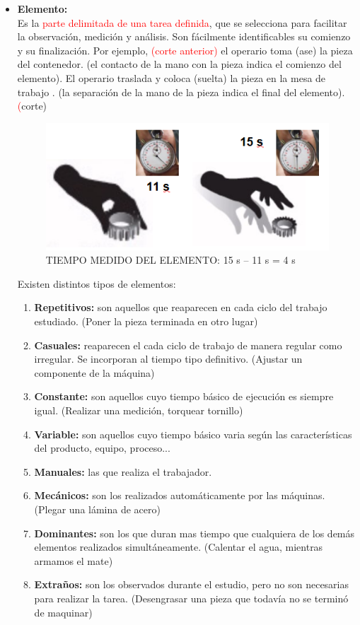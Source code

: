 \documentclass[a4paper,oneside,11pt]{article}
\begin{document}
\begin{itemize}
    \item \textbf{Elemento:} \\
    Es la \textcolor{red}{parte delimitada de una tarea definida}, que se selecciona para facilitar la observación, medición y análisis. Son fácilmente identificables su comienzo y su finalización. Por ejemplo, \textcolor{red}{(corte anterior)} el operario toma (ase) la pieza del contenedor. (el contacto de la mano con la pieza indica el comienzo del elemento). El operario traslada y coloca (suelta) la pieza en la mesa de trabajo . (la separación de la mano de la pieza indica el final del elemento).  \textcolor{red}(corte)

    \begin{figure} [ht!]
        \centering
        \includegraphics[scale=1]{elemento.png}
        \caption{TIEMPO MEDIDO DEL ELEMENTO: 15 s – 11 s = 4 s}
    \end{figure}

    Existen distintos tipos de elementos:
    \begin{enumerate}
        \item \textbf{Repetitivos:} son aquellos que reaparecen en cada ciclo del trabajo estudiado. (Poner la pieza terminada en otro lugar)
        \item \textbf{Casuales:} reaparecen el cada ciclo de trabajo de manera regular como irregular. Se incorporan al tiempo tipo definitivo. (Ajustar un componente de la máquina)
        \item \textbf{Constante: } son aquellos cuyo tiempo básico de ejecución es siempre igual. (Realizar una medición, torquear tornillo)
        \item \textbf{Variable: } son aquellos cuyo tiempo básico varia según las características del producto, equipo, proceso...
        \item \textbf{Manuales: } las que realiza el trabajador.
        \item \textbf{Mecánicos: } son los realizados automáticamente por las máquinas. (Plegar una lámina de acero)
        \item \textbf{Dominantes: }son los que duran mas tiempo que cualquiera de los demás elementos realizados simultáneamente. (Calentar el agua, mientras armamos el mate)
        \item \textbf{Extraños: }son los observados durante el estudio, pero no son necesarias para realizar la tarea. (Desengrasar una pieza que todavía no se terminó de maquinar)
    \end{enumerate}


\end{itemize}
\end{document}
